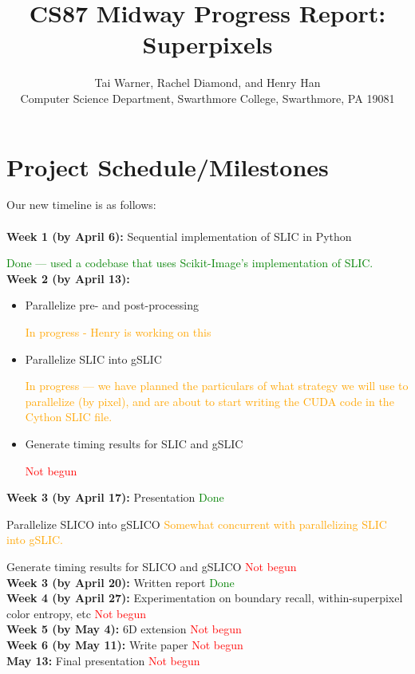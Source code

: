 \documentclass[11pt]{article}
\begin{document}
\title{CS87 Midway Progress Report: Superpixels}

\author{Tai Warner, Rachel Diamond, and Henry Han \\
Computer Science Department, Swarthmore College, Swarthmore, PA  19081}

\maketitle

\section{Project Schedule/Milestones}

{
Our new timeline is as follows:\\\\
\textbf{Week 1 (by April 6):} Sequential implementation of SLIC in Python 

\textcolor{green}{Done --- used a codebase that uses Scikit-Image's implementation of SLIC.}\\
\textbf{Week 2 (by April 13):} 
\begin{itemize}
\item Parallelize pre- and post-processing 

\textcolor{orange}{In progress - Henry is working on this}

\item Parallelize SLIC into gSLIC 

\textcolor{orange}{In progress --- we have planned the particulars of what strategy we will use to parallelize (by pixel), and are about to start writing the CUDA code in the Cython SLIC file.}

\item Generate timing results for SLIC and gSLIC

\textcolor{red}{Not begun}

\end{itemize}
\textbf{Week 3 (by April 17):} Presentation \textcolor{green}{Done}

Parallelize SLICO into gSLICO \textcolor{orange}{Somewhat concurrent with parallelizing SLIC into gSLIC.}

Generate timing results for SLICO and gSLICO \textcolor{red}{Not begun}\\
\textbf{Week 3 (by April 20):} Written report \textcolor{green}{Done}\\
\textbf{Week 4 (by April 27):} Experimentation on boundary recall, within-superpixel color entropy, etc \textcolor{red}{Not begun}\\
\textbf{Week 5 (by May 4):} 6D extension \textcolor{red}{Not begun}\\
\textbf{Week 6 (by May 11):} Write paper \textcolor{red}{Not begun}\\
\textbf{May 13:} Final presentation \textcolor{red}{Not begun}
}
\end{document}
